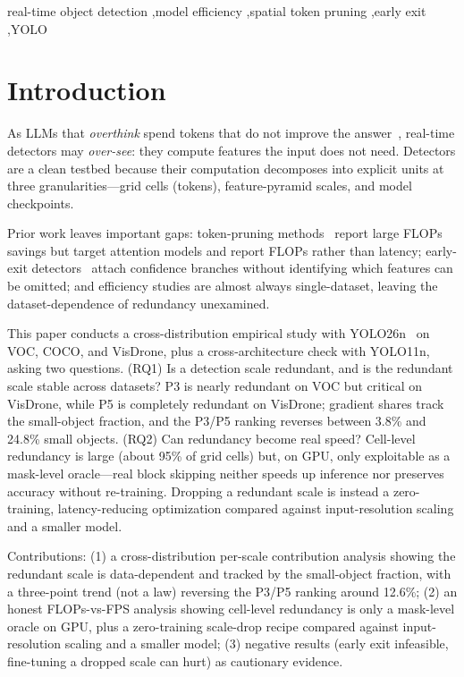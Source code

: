 \documentclass[a4paper,fleqn]{cas-dc}
\begin{document}
\begin{keywords}
real-time object detection \sep model efficiency \sep spatial token pruning \sep early exit \sep YOLO
\end{keywords}

\maketitle

\section{Introduction}
As LLMs that \emph{overthink} spend tokens that do not improve the answer~\cite{wei2022chain,feng2025efficient}, real-time detectors may \emph{over-see}: they compute features the input does not need. Detectors are a clean testbed because their computation decomposes into explicit units at three granularities---grid cells (tokens), feature-pyramid scales, and model checkpoints.

Prior work leaves important gaps: token-pruning methods~\cite{rao2021dynamicvit,liang2022evit,bolya2023tome,meng2021adavit} report large FLOPs savings but target attention models and report FLOPs rather than latency; early-exit detectors~\cite{teerapittayanon2016branchynet,scholte2025eobranch,anytimeyolo2025} attach confidence branches without identifying which features can be omitted; and efficiency studies are almost always single-dataset, leaving the dataset-dependence of redundancy unexamined.

This paper conducts a cross-distribution empirical study with YOLO26n~\cite{jocher2026ultralyticsyolo26unifiedrealtime} on VOC, COCO, and VisDrone, plus a cross-architecture check with YOLO11n, asking two questions. (RQ1) Is a detection scale redundant, and is the redundant scale stable across datasets? P3 is nearly redundant on VOC but critical on VisDrone, while P5 is completely redundant on VisDrone; gradient shares track the small-object fraction, and the P3/P5 ranking reverses between 3.8\% and 24.8\% small objects. (RQ2) Can redundancy become real speed? Cell-level redundancy is large (about 95\% of grid cells) but, on GPU, only exploitable as a mask-level oracle---real block skipping neither speeds up inference nor preserves accuracy without re-training. Dropping a redundant scale is instead a zero-training, latency-reducing optimization compared against input-resolution scaling and a smaller model.

Contributions: (1) a cross-distribution per-scale contribution analysis showing the redundant scale is data-dependent and tracked by the small-object fraction, with a three-point trend (not a law) reversing the P3/P5 ranking around 12.6\%; (2) an honest FLOPs-vs-FPS analysis showing cell-level redundancy is only a mask-level oracle on GPU, plus a zero-training scale-drop recipe compared against input-resolution scaling and a smaller model; (3) negative results (early exit infeasible, fine-tuning a dropped scale can hurt) as cautionary evidence.
\end{document}
